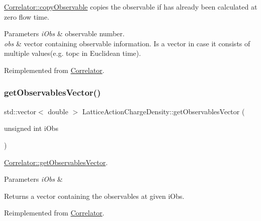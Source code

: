 \mbox{\hyperlink{class_correlator_ac780d8b180294ee4801ede6e6a13f7f4}{Correlator\+::copy\+Observable}} copies the observable if has already been calculated at zero flow time. 


\begin{DoxyParams}{Parameters}
{\em i\+Obs} & observable number. \\
\hline
{\em obs} & vector containing observable information. Is a vector in case it consists of multiple values(e.\+g. topc in Euclidean time). \\
\hline
\end{DoxyParams}


Reimplemented from \mbox{\hyperlink{class_correlator_ac780d8b180294ee4801ede6e6a13f7f4}{Correlator}}.

\mbox{\label{class_lattice_action_charge_density_a72952fbe5ade96d53196d6c2c93896e5}} 
\subsubsection{\texorpdfstring{getObservablesVector()}{getObservablesVector()}}
{\footnotesize\ttfamily std\+::vector$<$ double $>$ Lattice\+Action\+Charge\+Density\+::get\+Observables\+Vector (\begin{DoxyParamCaption}\item[{unsigned int}]{i\+Obs }\end{DoxyParamCaption})\hspace{0.3cm}{\ttfamily [virtual]}}



\mbox{\hyperlink{class_correlator_a7fb062b098beb078f3e546f4717b4941}{Correlator\+::get\+Observables\+Vector}}. 


\begin{DoxyParams}{Parameters}
{\em i\+Obs} & \\
\hline
\end{DoxyParams}
\begin{DoxyReturn}{Returns}
a vector containing the observables at given i\+Obs. 
\end{DoxyReturn}


Reimplemented from \mbox{\hyperlink{class_correlator_a7fb062b098beb078f3e546f4717b4941}{Correlator}}.

